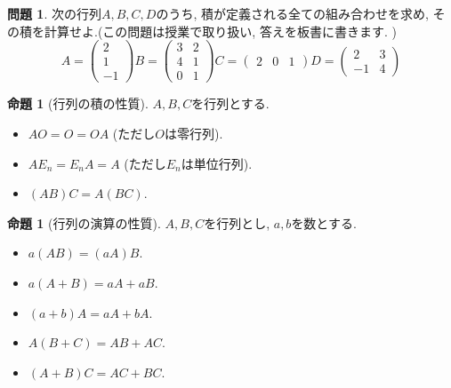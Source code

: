 \documentclass[dvipdfmx,a4paper,11pt]{article}
\theoremstyle{definition}
\newtheorem{prop}[thm]{命題}
\newtheorem{ques}[thm]{問題}
\begin{document}
 \begin{ques}
 次の行列$A,B,C,D$のうち, 積が定義される全ての組み合わせを求め, その積を計算せよ.(この問題は授業で取り扱い, 答えを板書に書きます. )
 $$
  A=\begin{pmatrix}
 2 \\ 1\\-1
 \end{pmatrix} 
B= \begin{pmatrix}
 3 &2\\
 4&1\\
 0&1
 \end{pmatrix} 
 C=
  \begin{pmatrix}
 2 &0&1 
 \end{pmatrix}
 D= \begin{pmatrix}
 2&3\\
 -1&4
 \end{pmatrix}
 $$
 \end{ques}


 
 \begin{tcolorbox}[
    colback = white,
    colframe = green!35!black,
    fonttitle = \bfseries,
    breakable = true]
    \begin{prop}[行列の積の性質]
$A,B,C$を行列とする.
 \begin{itemize}
 	\setlength{\parskip}{0cm}
  	\setlength{\itemsep}{0pt} 
 \item $AO =O = OA$ (ただし$O$は零行列).
  \item $AE_{n}=E_{n}A =A$ (ただし$E_n$は単位行列). 
  \item $(AB)C = A(BC)$.　
 \end{itemize}
  \end{prop}
 \end{tcolorbox}

 \begin{tcolorbox}[
    colback = white,
    colframe = green!35!black,
    fonttitle = \bfseries,
    breakable = true]
    \begin{prop}[行列の演算の性質]
$A,B,C$を行列とし, $a,b$を数とする.
 \begin{itemize}
 	\setlength{\parskip}{0cm}
  	\setlength{\itemsep}{0pt} 
 \item $a(AB)=(aA)B$. 
  \item $a(A+B)=aA + aB$. 
  \item $(a+b)A = aA + bA$.　
  \item $A(B+C) = AB + AC$.
  \item $(A+B)C = AC + BC$.
 \end{itemize}
  \end{prop}
 \end{tcolorbox}
\end{document}
